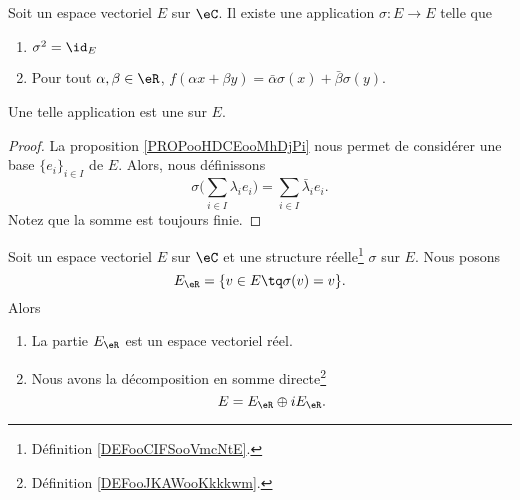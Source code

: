 \begin{propositionDef}         \label{DEFooCIFSooVmcNtE}
	Soit un espace vectoriel \( E\) sur \( \eC\). Il existe une application \( \sigma\colon E\to E\) telle que
	\begin{enumerate}
		\item
		      \( \sigma^2=\id_E\)
		\item
		      Pour tout \( \alpha,\beta\in \eR\), \( f(\alpha x+\beta y)=\bar \alpha \sigma(x)+\bar \beta \sigma(y)\).
	\end{enumerate}
	Une telle application est une  sur \( E\).
\end{propositionDef}

\begin{proof}
	La proposition \ref{PROPooHDCEooMhDjPi} nous permet de considérer une base \( \{ e_i \}_{i\in I}\) de \( E\). Alors, nous définissons
	\begin{equation}
		\sigma\big( \sum_{i\in I}\lambda_ie_i \big)=\sum_{i\in I}\bar\lambda_ie_i.
	\end{equation}
	Notez que la somme est toujours finie.
\end{proof}

\begin{proposition}     \label{PROPooPZHPooNdarzg}
	Soit un espace vectoriel \( E\) sur \( \eC\) et une structure réelle\footnote{Définition \ref{DEFooCIFSooVmcNtE}.} \( \sigma\) sur \( E\). Nous posons
	\begin{equation}
		E_{\eR}=\{ v\in E\tq \sigma(v)=v \}.
	\end{equation}
	Alors
	\begin{enumerate}
		\item
		      La partie \( E_{\eR}\) est un espace vectoriel réel.
		\item
		      Nous avons la décomposition en somme directe\footnote{Définition \ref{DEFooJKAWooKkkkwm}.}
		      \begin{equation}
			      E=E_{\eR}\oplus iE_{\eR}.
		      \end{equation}
	\end{enumerate}
\end{proposition}


